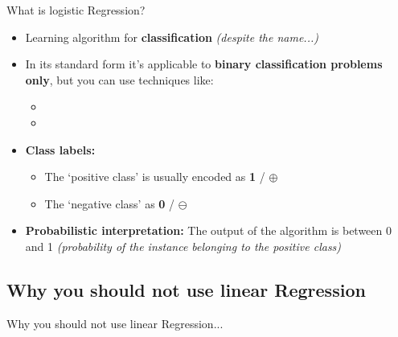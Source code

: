 \begin{frame}{What is logistic Regression?}{}
	\begin{itemize}
		\item Learning algorithm for \textbf{classification} {\footnotesize \textit{(despite the name...)}}
		\item In its standard form it's applicable to \textbf{binary classification problems only}, but you can use techniques like:
		\begin{itemize}
			\item {}
			\item {}
		\end{itemize}
		\item \textbf{Class labels:}
		\begin{itemize}
			\item The `positive class' is usually encoded as \textbf{1} / $\oplus$
			\item The `negative class' as \textbf{0} / $\ominus$
		\end{itemize}
		\item \textbf{Probabilistic interpretation:} The output of the algorithm is between 0 and 1
			{\footnotesize \textit{(probability of the instance belonging to the positive class)}}
	\end{itemize}
\end{frame}


\subsection{Why you should not use linear Regression}

\begin{frame}{Why you should not use linear Regression...}{}\important
	
\end{frame}


